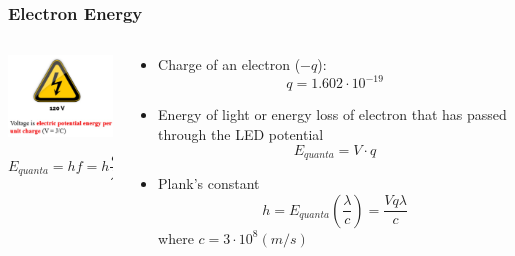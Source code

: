 \documentclass{beamer}
\begin{document}
\begin{frame}\frametitle{Electron Energy}
\begin{columns}
\begin{column}{4cm}
\begin{center}
\includegraphics[width=4cm]{fig/vjc.jpg}
\end{center}

\vspace{.25cm}

\[ E_{quanta} = h f = h \frac{c}{\lambda}\]

\end{column}
\begin{column}{7cm}
\begin{itemize}
\item Charge of an electron ($-q$):
\[ q = 1.602 \cdot 10^{-19}\]
\item Energy of light or energy loss of electron that has passed through the LED potential
\[ E_{quanta} = V \cdot q\] 
\item Plank's constant
\[ h = E_{quanta}(\frac{\lambda}{c}) = \frac{V q \lambda}{c} \]
where $c = 3 \cdot 10^{8} (m/s)$
\end{itemize}

\end{column}
\end{columns}
\end{frame}
\end{document}
